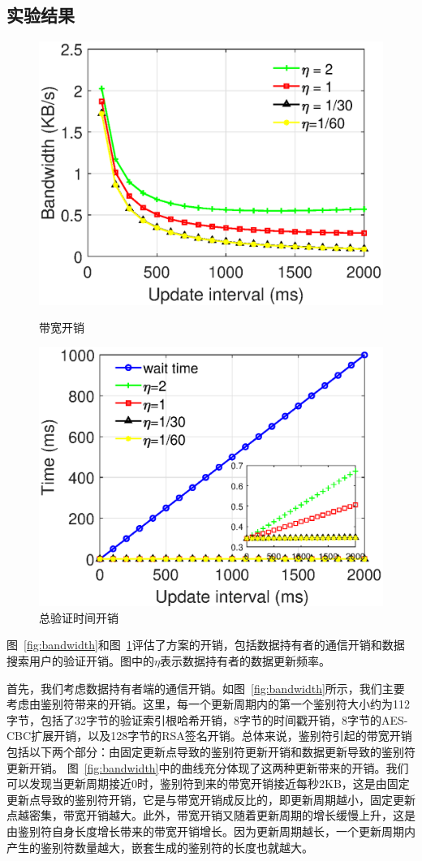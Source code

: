 \subsection{实验结果}
\label{sec:experiments}
\begin{figure}[ht]
  \begin{minipage}[b]{0.49\textwidth}
    \includegraphics[width= 3 in]{expr/bandwidth}
    \caption{带宽开销}
    \label{fig:bandwidth}
  \end{minipage}
  \begin{minipage}[b]{0.49\textwidth}
    \includegraphics[width= 3 in]{expr/verify-2}
    \caption{总验证时间开销}
    \label{fig:verify-2}
  \end{minipage}
\centering
\end{figure}

图~\ref{fig:bandwidth}和图~\ref{fig:verify-2}评估了\multi 方案的开销，包括数据持有者的通信开销和数据搜索用户的验证开销。图中的$\eta$表示数据持有者的数据更新频率。

首先，我们考虑数据持有者端的通信开销。如图~\ref{fig:bandwidth}所示，我们主要考虑由鉴别符带来的开销。这里，每一个更新周期内的第一个鉴别符大小约为112字节，包括了32字节的验证索引根哈希开销，8字节的时间戳开销，8字节的AES-CBC扩展开销，以及128字节的RSA签名开销。总体来说，鉴别符引起的带宽开销包括以下两个部分：由固定更新点导致的鉴别符更新开销和数据更新导致的鉴别符更新开销。
图~\ref{fig:bandwidth}中的曲线充分体现了这两种更新带来的开销。我们可以发现当更新周期接近0时，鉴别符到来的带宽开销接近每秒2KB，这是由固定更新点导致的鉴别符开销，它是与带宽开销成反比的，即更新周期越小，固定更新点越密集，带宽开销越大。此外，带宽开销又随着更新周期的增长缓慢上升，这是由鉴别符自身长度增长带来的带宽开销增长。因为更新周期越长，一个更新周期内产生的鉴别符数量越大，嵌套生成的鉴别符的长度也就越大。

